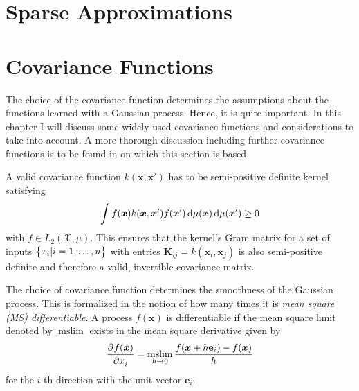 \documentclass[11pt,a4paper]{scrreprt}
\newcommand{\vc}[1]{\bm{#1}}
\newcommand{\vcc}[1]{\textbf{#1}}
\newcommand{\mat}[1]{\bm{#1}}
\DeclareMathOperator*{\mslim}{mslim}
\newcommand{\newterm}[1]{\emph{#1}}
\begin{document}
\section{Sparse Approximations}

\section{Covariance Functions}
The choice of the covariance function determines the assumptions about the 
functions learned with a Gaussian process. Hence, it is quite important. In this 
chapter I will discuss some widely used covariance functions and considerations 
to take into account. A more thorough discussion including further covariance 
functions is to be found in \textcite[Chapter 4]{Rasmussen:2006vz} on which this 
section is based.

A valid covariance function $k(\vc x, \vc x')$ has to be semi-positive definite 
kernel \parencite{Cressie:1993uu} satisfying
\begin{equation}
    \int f(\vc x) k(\vc x, \vc x') f(\vc x') \dif \mu(\vc x) \dif \mu(\vc x') 
    \geq 0
\end{equation}
with $f \in L_2(\mathcal{X}, \mu)$. This ensures that the kernel's Gram matrix 
for a set of inputs $\cbr{x_i | i = 1, \dots, n}$ with entries $\mat K_{ij} 
= k(\vc x_i, \vc x_j)$ is also semi-positive definite and therefore a valid, 
invertible covariance matrix.

The choice of covariance function determines the smoothness of the Gaussian 
process. This is formalized in the notion of how many times it is \newterm{mean 
    square (MS) differentiable}. A process $f(\vc x)$ is differentiable if the
mean square limit denoted by $\mslim$ exists in the mean square derivative given 
by
\begin{equation}
    \dpd{f(\vc x)}{x_i} = \mslim_{h \rightarrow 0} \frac{f(\vc x + h\vcc e_i) 
    - f(\vc x)}{h}
\end{equation}
for the $i$-th direction with the unit vector $\vcc e_i$.

\end{document}
